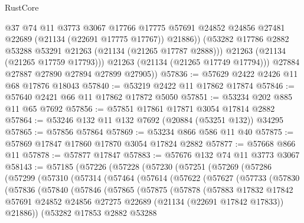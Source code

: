 \begin{lexlean}{RustCore}
\begin{coremodule}
                @37
                @74
                @11
                @3773
                @3067
                @17766
                @17775
                @57691
                @24852
                @24856
                @27481
                @22689
                (@21134 (@22691 @17775 @17767))
                @21886))
            (@53282 @17786 @2882 @53288 @53291 @21263 (@21134 (@21265 @17787 @2888)))
            @21263
            (@21134 (@21265 @17759 @17793)))
          @21263
          (@21134 (@21265 @17749 @17794)))
        @27884
        @27887
        @27890
        @27894
        @27899
        @27905))
@57836 := @57629 @2422 @2426 @11 @68 @17876 @18043
@57840 := @53219 @2422 @11 @17862 @17874
@57846 := @57640 @2421 @66 @11 @17862 @17872 @5050
@57851 := @53234 @202 @885 @11 @65 @7692
@57856 := @57851 @17861 @17871 @3054 @17814 @2882
@57864 := @53246 @132 @11 @132 @7692 (@20884 (@53251 @132)) @34295
@57865 := @57856 @57864
@57869 := @53234 @866 @586 @11 @40
@57875 := @57869 @17847 @17860 @17870 @3054 @17824 @2882
@57877 := @57668 @866 @11
@57878 := @57877 @17847
@57883 := @57676 @132 @74 @11 @3773 @3067
@58143 := @57185
    (@57226
      (@57228
        (@57230
          (@57251
            (@57269
              (@57286
                (@57299
                  (@57310
                    (@57314
                      (@57464
                        (@57614
                          (@57622
                            (@57627
                              (@57733
                                (@57830
                                  (@57836
                                    (@57840
                                      (@57846
                                        (@57865
                                          (@57875
                                            (@57878
                                              (@57883
                                                @17832
                                                @17842
                                                @57691
                                                @24852
                                                @24856
                                                @27275
                                                @22689
                                                (@21134 (@22691 @17842 @17833))
                                                @21886))
                                            (@53282
                                              @17853
                                              @2882
                                              @53288

\end{coremodule}
\end{lexlean}
